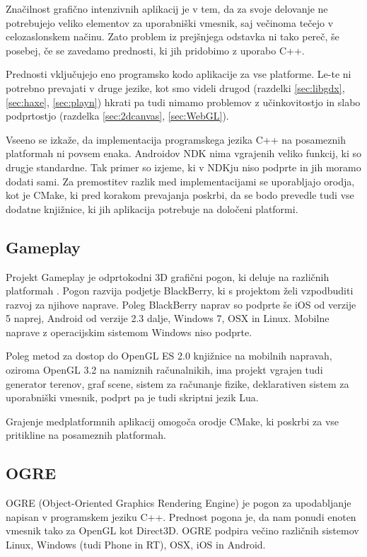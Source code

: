 Značilnost grafično intenzivnih aplikacij je v tem, da za svoje delovanje ne potrebujejo veliko elementov za uporabniški vmesnik, saj večinoma tečejo v celozaslonskem načinu. Zato problem iz prejšnjega odstavka ni tako pereč, še posebej, če se zavedamo prednosti, ki jih pridobimo z uporabo C++. 

Prednosti vključujejo eno programsko kodo aplikacije za vse platforme. Le-te ni potrebno prevajati v druge jezike, kot smo videli drugod (razdelki \ref{sec:libgdx}, \ref{sec:haxe}, \ref{sec:playn}) hkrati pa tudi nimamo problemov z učinkovitostjo in slabo podprtostjo (razdelka \ref{sec:2dcanvas}, \ref{sec:WebGL}).

Vseeno se izkaže, da implementacija programskega jezika C++ na posameznih platformah ni povsem enaka. Androidov NDK nima vgrajenih veliko funkcij, ki so drugje standardne. Tak primer so izjeme, ki v NDKju niso podprte in jih moramo dodati sami. Za premostitev razlik med implementacijami se uporabljajo orodja, kot je CMake, ki pred korakom prevajanja poskrbi, da se bodo prevedle tudi vse dodatne knjižnice, ki jih aplikacija potrebuje na določeni platformi.

\subsection{Gameplay}

Projekt Gameplay je odprtokodni 3D grafični pogon, ki deluje na različnih platformah \cite{gameplay}. Pogon razvija podjetje BlackBerry, ki s projektom želi vzpodbuditi razvoj za njihove naprave. Poleg BlackBerry naprav so podprte še iOS od verzije 5 naprej, Android od verzije 2.3 dalje, Windows 7, OSX in Linux. Mobilne naprave z operacijskim sistemom Windows niso podprte.

Poleg metod za dostop do OpenGL ES 2.0 knjižnice na mobilnih napravah, oziroma OpenGL 3.2 na namiznih računalnikih, ima projekt vgrajen tudi generator terenov, graf scene, sistem za računanje fizike, deklarativen sistem za uporabniški vmesnik, podprt pa je tudi skriptni jezik Lua.

Grajenje medplatformnih aplikacij omogoča orodje CMake, ki poskrbi za vse pritikline na posameznih platformah. 

\subsection{OGRE}
\label{sec:ogre}
OGRE (Object-Oriented Graphics Rendering Engine) \cite{ogre} je pogon za upodabljanje napisan v programskem jeziku C++. Prednost pogona je, da nam ponudi enoten vmesnik tako za OpenGL kot Direct3D. OGRE podpira večino različnih sistemov Linux, Windows (tudi Phone in RT), OSX, iOS in Android.

